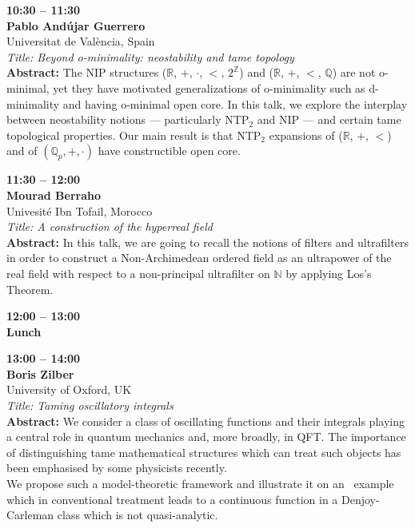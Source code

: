 \documentclass[10pt,a4paper]{article}
\begin{document}
\begin{tcolorbox}[talkbox]
\textbf{10:30 -- 11:30} \\
\textbf{Pablo Andújar Guerrero} \\
Universitat de València, Spain \\
\textit{Title: Beyond o-minimality: neostability and tame topology} \\
\textbf{Abstract:} The NIP structures ($\mathbb{R}$, $+$, $\cdot$, $<$, $2^\mathbb{Z}$) and ($\mathbb{R}$, $+$, $<$, $\mathbb{Q}$) are not o-minimal, yet they have motivated generalizations of o-minimality such as d-minimality and having o-minimal open core. In this talk, we explore the interplay between neostability notions --- particularly NTP$_2$ and NIP --- and certain tame topological properties. Our main result is that NTP$_2$ expansions of ($\mathbb{R}$, $+$, $<$) and of $(\mathbb{Q}_p, +, \cdot)$ have constructible open core.
\end{tcolorbox}

\begin{tcolorbox}[talkbox]
\textbf{11:30 -- 12:00} \\
\textbf{Mourad Berraho} \\
Univesité Ibn Tofail, Morocco \\
\textit{Title: A construction of the hyperreal field} \\
\textbf{Abstract:} In this talk, we are going to recall the notions of filters and ultrafilters in order to construct a Non-Archimedean ordered field as an ultrapower of the real field with respect to a non-principal ultrafilter on $\mathbb{N}$ by applying Los’s Theorem.
\end{tcolorbox}

\begin{tcolorbox}[talkbox]
\textbf{12:00 -- 13:00} \\
\textbf{Lunch}
\end{tcolorbox}

\begin{tcolorbox}[talkbox]
\textbf{13:00 -- 14:00} \\
\textbf{Boris Zilber} \\
University of Oxford, UK \\
\textit{Title: Taming oscillatory integrals} \\
\textbf{Abstract:} We consider a class of oscillating functions and their integrals  playing a central role in quantum mechanics and, more broadly, in QFT. The importance of distinguishing tame mathematical structures which can treat such objects has been emphasised by some physicists recently.\\

We propose such a model-theoretic framework and illustrate it on an  example which in conventional treatment leads to a continuous function in a Denjoy-Carleman class which is not quasi-analytic.  
\end{tcolorbox}
\end{document}

